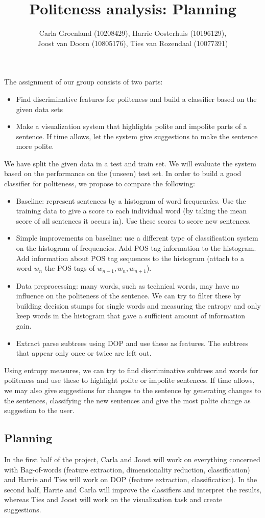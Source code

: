 \documentclass[11pt, english]{article}
\title{Politeness analysis: Planning}
\author{Carla Groenland (10208429), Harrie Oosterhuis (10196129), \\
Joost van Doorn (10805176), Ties van Rozendaal (10077391)}
\begin{document}
\maketitle
\noindent The assignment of our group consists of two parts:
\begin{itemize}
\item Find discriminative features for politeness and build a classifier based on the given data sets
\item Make a visualization system that highlights polite and impolite parts of a sentence. If time allows, let the system give suggestions to make the sentence more polite.
\end{itemize}
We have split the given data in a test and train set. We will evaluate the system based on the performance on the (unseen) test set.
In order to build a good classifier for politeness, we propose to compare the following:
\begin{itemize}
\item Baseline: represent sentences by a histogram of word frequencies. Use the training data to give a score to each individual word (by taking the mean score of all sentences it occurs in). Use these scores to score new sentences. 
\item Simple improvements on baseline: use a different type of classification system on the histogram of frequencies. Add POS tag information to the histogram. Add information about POS tag sequences to the histogram (attach to a word $w_n$ the POS tags of $w_{n-1},w_n,w_{n+1}$).
\item Data preprocessing: many words, such as technical words, may have no influence on the politeness of the sentence. We can try to filter these by building decision stumps for single words and measuring the entropy and only keep words in the histogram that gave a sufficient amount of information gain.
\item Extract parse subtrees using DOP and use these as features. The subtrees that appear only once or twice are left out. 
\end{itemize}
Using entropy measures, we can try to find discriminative subtrees and words for politeness and use these to highlight polite or impolite sentences. 
If time allows, we may also give suggestions for changes to the sentence by generating changes to the sentences, classifying the new sentences and give the most polite change as suggestion to the user.

\subsection*{Planning}
In the first half of the project, Carla and Joost will work on everything concerned with Bag-of-words (feature extraction, dimensionality reduction, classification) and Harrie and Ties will work on DOP (feature extraction, classification). In the second half, Harrie and Carla will improve the classifiers and interpret the results, whereas Ties and Joost will work on the visualization task and create suggestions.  
\end{document}
